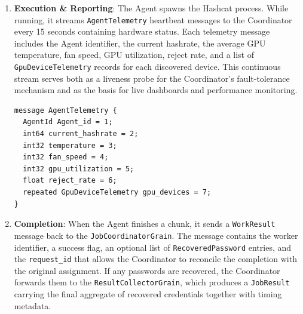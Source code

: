 \begin{enumerate}
\begin{enumerate}

    \end{enumerate}

    \item \textbf{Execution \& Reporting}: The Agent spawns the Hashcat process. While running, it streams \verb|AgentTelemetry| heartbeat messages to the Coordinator every 15 seconds containing hardware status. Each telemetry message includes the Agent identifier, the current hashrate, the average GPU temperature, fan speed, GPU utilization, reject rate, and a list of \verb|GpuDeviceTelemetry| records for each discovered device. This continuous stream serves both as a liveness probe for the Coordinator's fault-tolerance mechanism and as the basis for live dashboards and performance monitoring.

\begin{verbatim}
message AgentTelemetry {
  AgentId Agent_id = 1;
  int64 current_hashrate = 2;
  int32 temperature = 3;
  int32 fan_speed = 4;
  int32 gpu_utilization = 5;
  float reject_rate = 6;
  repeated GpuDeviceTelemetry gpu_devices = 7;
}
\end{verbatim}

    \item \textbf{Completion}: When the Agent finishes a chunk, it sends a \verb|WorkResult| message back to the \verb|JobCoordinatorGrain|. The message contains the worker identifier, a success flag, an optional list of \verb|RecoveredPassword| entries, and the \verb|request_id| that allows the Coordinator to reconcile the completion with the original assignment. If any passwords are recovered, the Coordinator forwards them to the \verb|ResultCollectorGrain|, which produces a \verb|JobResult| carrying the final aggregate of recovered credentials together with timing metadata.


\end{enumerate}
